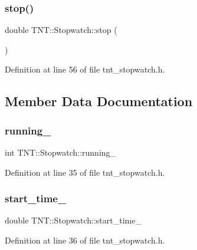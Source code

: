 \subsubsection{\texorpdfstring{stop()}{stop()}}
{\footnotesize\ttfamily double T\+N\+T\+::\+Stopwatch\+::stop (\begin{DoxyParamCaption}{ }\end{DoxyParamCaption})\hspace{0.3cm}{\ttfamily [inline]}}



Definition at line 56 of file tnt\+\_\+stopwatch.\+h.



\subsection{Member Data Documentation}
\mbox{\label{classTNT_1_1Stopwatch_a892b25c730a3f494a88a0456ee7a426a}} 
\subsubsection{\texorpdfstring{running\+\_\+}{running\_}}
{\footnotesize\ttfamily int T\+N\+T\+::\+Stopwatch\+::running\+\_\+\hspace{0.3cm}{\ttfamily [private]}}



Definition at line 35 of file tnt\+\_\+stopwatch.\+h.

\mbox{\label{classTNT_1_1Stopwatch_a354390f67fbc2ecc42cf37809cf681d4}} 
\subsubsection{\texorpdfstring{start\+\_\+time\+\_\+}{start\_time\_}}
{\footnotesize\ttfamily double T\+N\+T\+::\+Stopwatch\+::start\+\_\+time\+\_\+\hspace{0.3cm}{\ttfamily [private]}}



Definition at line 36 of file tnt\+\_\+stopwatch.\+h.

